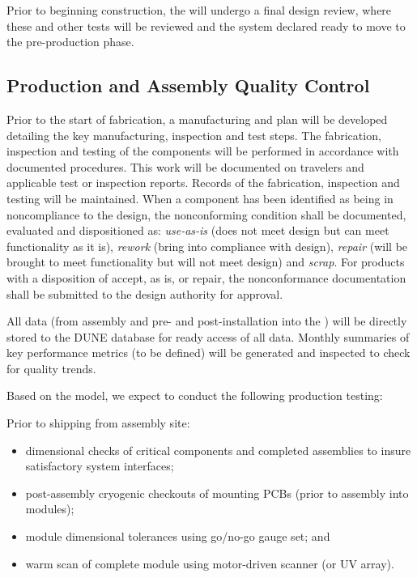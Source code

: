 Prior to beginning construction, the  will undergo a final design review, where these and other  tests will be reviewed and the system declared ready to move to the pre-production phase.


\subsection{Production and Assembly Quality Control}
\label{sec:fdsp-pd-prodqc}


Prior to the start of fabrication, a manufacturing and  plan will be developed detailing the key manufacturing, inspection and test steps.  The fabrication, inspection and testing of the components will be performed in accordance with documented procedures. This work will be documented on travelers and applicable test or inspection reports. Records of the fabrication, inspection and testing will be maintained. When a component has been identified as being in noncompliance to the design, the nonconforming condition shall be documented, evaluated and dispositioned as: {\it use-as-is} (does not meet design but can meet functionality as it is), {\it rework} (bring into compliance with design), {\it repair} (will be brought to meet functionality but will not meet design) and {\it scrap}. For products with a disposition of accept, as is, or repair, the nonconformance documentation shall be submitted to the design authority for approval.   

All  data  (from assembly and pre- and post-installation into the ) will be directly stored to the DUNE database for ready access of all  data.  Monthly summaries of key performance metrics (to be defined) will be generated and inspected to check for quality trends.

Based on the  model, we expect to conduct the following production testing:

Prior to shipping from assembly site:
\begin{itemize}
\item dimensional checks of critical components and completed assemblies to insure satisfactory system interfaces;
\item post-assembly cryogenic checkouts of  mounting PCBs (prior to assembly into  modules);
\item module dimensional tolerances using go/no-go gauge set; and
\item warm scan of complete module using motor-driven  scanner (or UV   array).
\end{itemize}

